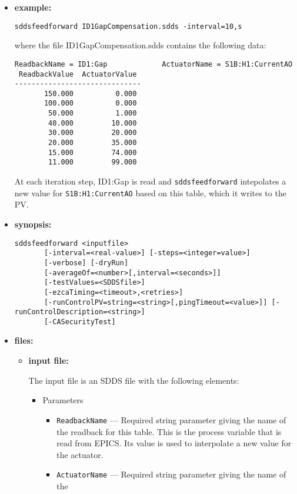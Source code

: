 \begin{itemize}
\item {\bf example:} 
%
% 
%
\begin{verbatim}
sddsfeedforward ID1GapCompensation.sdds -interval=10,s 
\end{verbatim}
where the file ID1GapCompensation.sdds contains the following
data:
\begin{verbatim}
ReadbackName = ID1:Gap             ActuatorName = S1B:H1:CurrentAO  
 ReadbackValue  ActuatorValue 
------------------------------
       150.000          0.000 
       100.000          0.000 
        50.000          1.000 
        40.000         10.000 
        30.000         20.000 
        20.000         35.000 
        15.000         74.000 
        11.000         99.000 
\end{verbatim}
At each iteration step, ID1:Gap is read and \verb+sddsfeedforward+ intepolates a new value for
\verb+S1B:H1:CurrentAO+ based on this table, which it writes to the PV.
\item {\bf synopsis:} 
%
%
\begin{verbatim}
sddsfeedforward <inputfile>
       [-interval=<real-value>] [-steps=<integer=value>]
       [-verbose] [-dryRun]
       [-averageOf=<number>[,interval=<seconds>]] 
       [-testValues=<SDDSfile>]
       [-ezcaTiming=<timeout>,<retries>]
       [-runControlPV=string=<string>[,pingTimeout=<value>]] [-runControlDescription=<string>]
       [-CASecurityTest] 
\end{verbatim}
\item {\bf files:}
\begin{itemize}
\item {\bf input file:} \par
The input file is an SDDS file with the following elements:
\begin{itemize}
\item Parameters
\begin{itemize}
\item {\tt ReadbackName} --- Required string parameter giving the name of the
        readback for this table.  This is the process variable that is read from
        EPICS.  Its value is used to interpolate a new value for the actuator.
\item {\tt ActuatorName} --- Required string parameter giving the name of the

\end{itemize}
\end{itemize}
\end{itemize}
\end{itemize}
